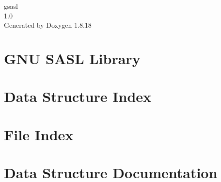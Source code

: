 \let\mypdfximage\pdfximage\def\pdfximage{\immediate\mypdfximage}\documentclass[twoside]{book}
\newcommand{\+}{\discretionary{\mbox{\scriptsize$\hookleftarrow$}}{}{}}
\newcommand{\clearemptydoublepage}{%
  \newpage{\pagestyle{empty}\cleardoublepage}%
}
\begin{document}
\hypersetup{pageanchor=false,
             bookmarksnumbered=true,
             pdfencoding=unicode
            }
\begin{titlepage}
\vspace*{7cm}
\begin{center}%
{\Large gsasl \\[1ex]\large 1.\+0 }\\
\vspace*{1cm}
{\large Generated by Doxygen 1.8.18}\\
\end{center}
\end{titlepage}
\clearemptydoublepage
{}
\tableofcontents
\clearemptydoublepage
{}
\hypersetup{pageanchor=true}

\chapter{G\+NU S\+A\+SL Library}
\label{index}\hypertarget{index}{}
\chapter{Data Structure Index}

\chapter{File Index}

\chapter{Data Structure Documentation}



















\end{document}
